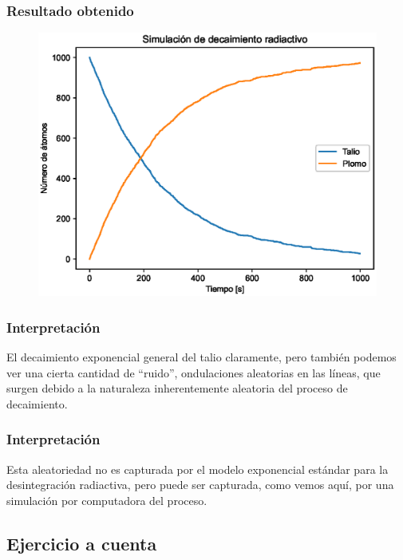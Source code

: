 \documentclass[12pt]{beamer}
\begin{document}
\begin{frame}
\frametitle{Resultado obtenido}
\begin{figure}
    \centering
    \includegraphics[scale=0.55]{Imagenes/plot_decaimiento_radiactivo_01.eps}
\end{figure}
\end{frame}
\begin{frame}
\frametitle{Interpretación}
El decaimiento exponencial general del talio claramente, pero también podemos ver una cierta cantidad de \enquote{ruido}, \pause ondulaciones aleatorias en las líneas, que surgen debido a la naturaleza inherentemente aleatoria del proceso de decaimiento.
\end{frame}
\begin{frame}
\frametitle{Interpretación}
Esta aleatoriedad no es capturada por el modelo exponencial estándar para la desintegración radiactiva, \pause pero puede ser capturada, como vemos aquí, por una simulación por computadora del proceso.
\end{frame}

\subsection{Ejercicio a cuenta}
\end{document}
